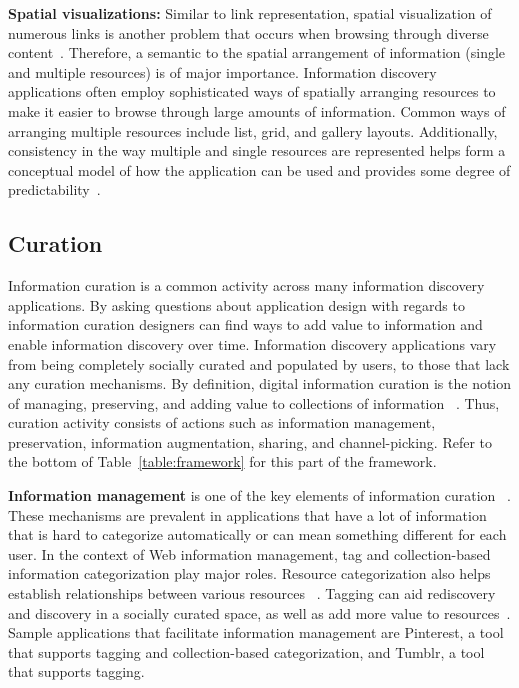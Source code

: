 \documentclass{sigchi}
\newcommand{\feature}[1]{{\ttfamily#1}}
\begin{document}
{{\textbf{Spatial visualizations:} Similar to link representation, spatial visualization of numerous links is another problem that occurs when browsing through diverse content~\cite{abrams1998information}. Therefore, a semantic to the \feature{spatial arrangement} of information (single and multiple resources) is of major importance. Information discovery applications often employ sophisticated ways of spatially arranging resources to make it easier to browse through large amounts of information. Common ways of arranging multiple resources include \feature{lis}t, \feature{grid}, and \feature{gallery} layouts. Additionally, \feature{consistency} in the way multiple and single resources are represented helps form a conceptual model of how the application can be used and provides some degree of predictability~\cite{norman2002design}.
} %

{\subsection{Curation}
Information curation is a common activity across many information discovery applications. By asking questions about application design with regards to information curation designers can find ways to add value to information and enable information discovery over time. 
%
Information discovery applications vary from being completely socially curated and populated by users, to those that lack any curation mechanisms. 
By definition, digital information curation is the notion of managing, preserving, and adding value to collections of information ~\cite{beagrie2008digital,whittaker2011personal}. Thus, curation activity consists of actions such as information management, preservation, information augmentation, sharing, and channel-picking. Refer to the bottom of Table~\ref{table:framework} for this part of the framework.

\textbf{
Information management} is one of the key elements of information curation ~\cite{beagrie2008digital,whittaker2011personal}. These mechanisms are prevalent in applications that have a lot of information that is hard to categorize automatically or can mean something different for each user. In the context of Web information management, \feature{tag} and \feature{collection-based} information categorization play major roles.
%
Resource categorization also helps establish relationships between various resources ~\cite{beagrie2008digital,whittaker2011personal}. Tagging can aid rediscovery and discovery in a socially curated space, as well as add more value to resources~\cite{gruber2007ontology}. Sample applications that facilitate information management are Pinterest, a tool that supports tagging and collection-based categorization, and Tumblr, a tool that supports tagging.

}}
\end{document}
